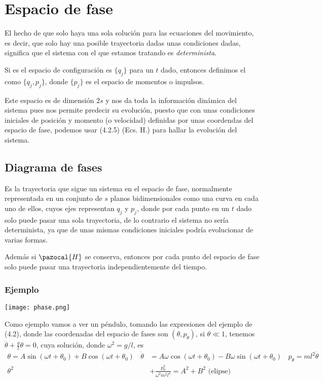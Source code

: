 \section{Espacio de fase} 
El hecho de que solo haya una sola solución para las ecuaciones del movimiento, es decir, que solo hay una posible trayectoria dadas unas condiciones dadas, significa que el sistema con el que estamos tratando es \textit{determinista}.

Si es el espacio de configuración es $\{q_j\}$ para un $t$ dado, entonces definimos el  como $\{q_j,p_j\}$, donde $\{p_j\}$ es el espacio de momentos o impulsos.

Este espacio es de dimensión $2s$ y nos da toda la información dinámica del sistema pues nos permite predecir su evolución, puesto que con unas condiciones iniciales de posición y momento (o velocidad) definidas por unas coordendas del espacio de fase, podemos usar (4.2.5) (Ecs. H.) para hallar la evolución del sistema.
\subsection{Diagrama de fases}
Es la trayectoria que sigue un sistema en el espacio de fase, normalmente representada en un conjunto de $s$ planos bidimensionales como una curva en cada uno de ellos, cuyos ejes representan $q_j$ y $p_j$, donde por cada punto en un $t$ dado solo puede pasar una sola trayectoria, de lo contrario el sistema no sería determinista, ya que de unas mismas condiciones iniciales podría evolucionar de varias formas.

Además si $\pazocal{H}$ se conserva, entonces por cada punto del espacio de fase solo puede pasar una trayectoria independientemente del tiempo.

\subsubsection{Ejemplo}
\begin{marginfigure}[0cm]
	\texttt{[image: phase.png]}
\end{marginfigure}
Como ejemplo vamos a ver un péndulo, tomando las expresiones del ejemplo de (4.2), donde las coordenadas del espacio de fases son $(\theta,p_\theta)$, si $\theta \ll 1$, tenemos $\ddot{\theta}+\frac{g}{l}\theta=0$, cuya solución, donde $\omega^2=g/l$, es
\[
    \begin{split}
        \theta = A \sin{(\omega t + \theta_0)}+ B \cos{(\omega t + \theta_0)} \ \ \ \ \dot{\theta} &= A\omega \cos{(\omega t + \theta_0)}- B \omega \sin{(\omega t + \theta_0)} \ \ \ \ p_\theta = ml^2 \dot{\theta}\\ 
        \theta^2 &+ \frac{p_\theta^2}{\omega^2 m^2l^4}=A^2+B^2 \mbox{ (elipse)}
    \end{split}    
\]

